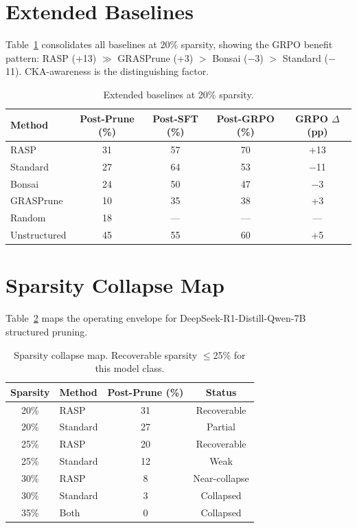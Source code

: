 \documentclass[11pt,a4paper]{article}
\newcommand{\method}{RASP}
\begin{document}
\appendix
\section{Extended Baselines}
\label{app:baselines}

Table~\ref{tab:extended} consolidates all baselines at 20\% sparsity, showing the GRPO benefit pattern: \method{} (+13) $\gg$ GRASPrune (+3) $>$ Bonsai ($-$3) $>$ Standard ($-$11). CKA-awareness is the distinguishing factor.

\begin{table}[h]
\centering
\small
\caption{Extended baselines at 20\% sparsity.}
\label{tab:extended}
\begin{tabular}{lcccc}
\toprule
\textbf{Method} & \textbf{Post-Prune (\%)} & \textbf{Post-SFT (\%)} & \textbf{Post-GRPO (\%)} & \textbf{GRPO $\Delta$ (pp)} \\
\midrule
\method{} & 31 & 57 & 70 & +13 \\
Standard & 27 & 64 & 53 & $-$11 \\
Bonsai & 24 & 50 & 47 & $-$3 \\
GRASPrune & 10 & 35 & 38 & +3 \\
Random & 18 & --- & --- & --- \\
Unstructured & 45 & 55 & 60 & +5 \\
\bottomrule
\end{tabular}
\end{table}

\section{Sparsity Collapse Map}
\label{app:collapse}

Table~\ref{tab:collapse} maps the operating envelope for DeepSeek-R1-Distill-Qwen-7B structured pruning.

\begin{table}[h]
\centering
\small
\caption{Sparsity collapse map. Recoverable sparsity $\leq$25\% for this model class.}
\label{tab:collapse}
\begin{tabular}{clcc}
\toprule
\textbf{Sparsity} & \textbf{Method} & \textbf{Post-Prune (\%)} & \textbf{Status} \\
\midrule
20\% & \method{} & 31 & Recoverable \\
20\% & Standard & 27 & Partial \\
25\% & \method{} & 20 & Recoverable \\
25\% & Standard & 12 & Weak \\
30\% & \method{} & 8 & Near-collapse \\
30\% & Standard & 3 & Collapsed \\
35\% & Both & 0 & Collapsed \\
\bottomrule
\end{tabular}
\end{table}
\end{document}
